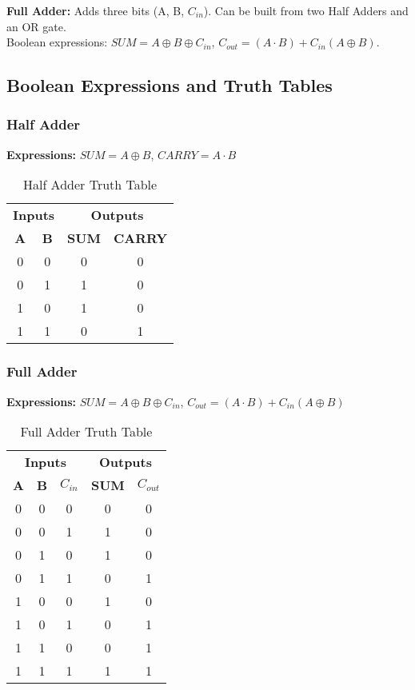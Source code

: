 \documentclass[11pt]{article}
\begin{document}
\textbf{Full Adder:} Adds three bits (A, B, $C_{in}$). Can be built from two Half Adders and an OR gate.
\\Boolean expressions: \; $SUM = A\oplus B\oplus C_{in}$,\; $C_{out} = (A\cdot B) + C_{in}(A\oplus B)$.

\subsection{Boolean Expressions and Truth Tables}
\subsubsection{Half Adder}
\textbf{Expressions:} $SUM = A \oplus B$, $CARRY = A \cdot B$
\begin{table}[htbp]
    \centering
    \caption{Half Adder Truth Table}
    \begin{tabular}{cc cc}
        \toprule
        \multicolumn{2}{c}{\textbf{Inputs}} & \multicolumn{2}{c}{\textbf{Outputs}} \\
        \cmidrule(r){1-2} \cmidrule(l){3-4}
        \textbf{A} & \textbf{B} & \textbf{SUM} & \textbf{CARRY} \\ \midrule
        0 & 0 & 0 & 0 \\
        0 & 1 & 1 & 0 \\
        1 & 0 & 1 & 0 \\
        1 & 1 & 0 & 1 \\ \bottomrule
    \end{tabular}
\end{table}

\subsubsection{Full Adder}
\textbf{Expressions:} $SUM = A \oplus B \oplus C_{in}$, $C_{out} = (A \cdot B) + C_{in}(A \oplus B)$
\begin{table}[htbp]
    \centering
    \caption{Full Adder Truth Table}
    \begin{tabular}{ccc cc}
        \toprule
        \multicolumn{3}{c}{\textbf{Inputs}} & \multicolumn{2}{c}{\textbf{Outputs}} \\
        \cmidrule(r){1-3} \cmidrule(l){4-5}
        \textbf{A} & \textbf{B} & \textbf{$C_{in}$} & \textbf{SUM} & \textbf{$C_{out}$} \\ \midrule
        0 & 0 & 0 & 0 & 0 \\
        0 & 0 & 1 & 1 & 0 \\
        0 & 1 & 0 & 1 & 0 \\
        0 & 1 & 1 & 0 & 1 \\
        1 & 0 & 0 & 1 & 0 \\
        1 & 0 & 1 & 0 & 1 \\
        1 & 1 & 0 & 0 & 1 \\
        1 & 1 & 1 & 1 & 1 \\ \bottomrule
    \end{tabular}
\end{table}
\end{document}
